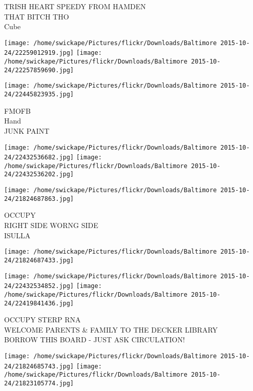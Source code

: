 \documentclass[10pt,letterpaper]{article}
\begin{document}
TRISH HEART SPEEDY FROM HAMDEN\\
THAT BITCH THO\\
Cube\\
\pagebreak

\texttt{[image: /home/swickape/Pictures/flickr/Downloads/Baltimore 2015-10-24/22259012919.jpg]}
\texttt{[image: /home/swickape/Pictures/flickr/Downloads/Baltimore 2015-10-24/22257859690.jpg]}

\vspace{0.25in}
\texttt{[image: /home/swickape/Pictures/flickr/Downloads/Baltimore 2015-10-24/22445823935.jpg]}

FMOFB\\
Hand\\
JUNK PAINT\\
\pagebreak

\texttt{[image: /home/swickape/Pictures/flickr/Downloads/Baltimore 2015-10-24/22432536682.jpg]}
\texttt{[image: /home/swickape/Pictures/flickr/Downloads/Baltimore 2015-10-24/22432536202.jpg]}

\vspace{0.25in}
\texttt{[image: /home/swickape/Pictures/flickr/Downloads/Baltimore 2015-10-24/21824687863.jpg]}

OCCUPY\\
RIGHT SIDE WORNG SIDE\\
ISULLA\\
\pagebreak

\texttt{[image: /home/swickape/Pictures/flickr/Downloads/Baltimore 2015-10-24/21824687433.jpg]}

\vspace{0.25in}
\texttt{[image: /home/swickape/Pictures/flickr/Downloads/Baltimore 2015-10-24/22432534852.jpg]}
\texttt{[image: /home/swickape/Pictures/flickr/Downloads/Baltimore 2015-10-24/22419841436.jpg]}

OCCUPY STERP RNA\\
WELCOME PARENTS \& FAMILY TO THE DECKER LIBRARY\\
BORROW THIS BOARD {-} JUST ASK CIRCULATION!\\
\pagebreak

\texttt{[image: /home/swickape/Pictures/flickr/Downloads/Baltimore 2015-10-24/21824685743.jpg]}
\texttt{[image: /home/swickape/Pictures/flickr/Downloads/Baltimore 2015-10-24/21823105774.jpg]}
\end{document}
